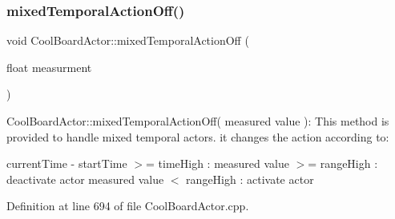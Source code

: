 \subsubsection{\texorpdfstring{mixed\+Temporal\+Action\+Off()}{mixedTemporalActionOff()}}
{\footnotesize\ttfamily void Cool\+Board\+Actor\+::mixed\+Temporal\+Action\+Off (\begin{DoxyParamCaption}\item[{float}]{measurment }\end{DoxyParamCaption})}

Cool\+Board\+Actor\+::mixed\+Temporal\+Action\+Off( measured value )\+: This method is provided to handle mixed temporal actors. it changes the action according to\+:

current\+Time -\/ start\+Time $>$= time\+High \+: measured value $>$= range\+High \+: deactivate actor measured value $<$ range\+High \+: activate actor 

Definition at line 694 of file Cool\+Board\+Actor.\+cpp.



